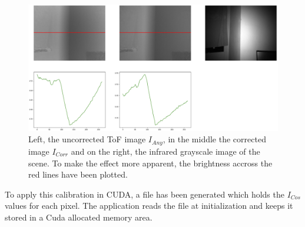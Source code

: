 \begin{figure}[H]
    \centering
    \includegraphics[width=1.0\textwidth]{images/flattened_tof_example.png}
    \caption{Left, the uncorrected ToF image $I_{Any}$, in the middle the corrected image $I_{Corr}$ and on the right, the infrared grayscale image of the scene. To make the effect more apparent, the brightness accross the red lines have been plotted.}
    \label{im:ToFCorrected}
\end{figure}
To apply this calibration in CUDA, a file has been generated which holds the $I_{Cos}$ values for each pixel. The application reads the file at initialization and keeps it stored in a Cuda allocated memory area. 

